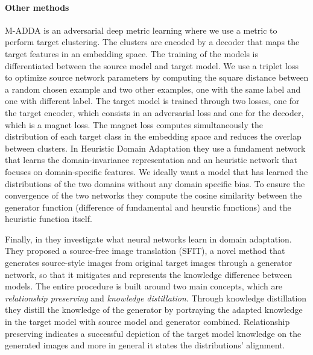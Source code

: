 \paragraph{Other methods}
M-ADDA\cite[Issam H. et al.]{madda} is an adversarial deep metric learning where we use a metric to perform target clustering. The clusters are encoded by a decoder that maps the target features in an embedding space.\newline 
The training of the models is differentiated between the source model and target model. We use a triplet loss to optimize source network parameters by computing the square distance between a random chosen example and two other examples, one with the same label and one with different label. The target model is trained through two losses, one for the target encoder, which consists in an adversarial loss and one for the decoder, which is a magnet loss. The magnet loss computes simultaneously the distribution of each target class in the embedding space and reduces the overlap between clusters. \newline 
In Heuristic Domain Adaptation\cite[Shuhao Cui et al.]{HDA} they use a fundament network that learns the domain-invariance representation and an heuristic network that focuses on domain-specific features. 
We ideally want a model that has learned the distributions of the two domains without any domain specific bias. To ensure the convergence of the two networks they compute the cosine similarity between the generator function (difference of fundamental and heurstic functions) and the heuristic function itself.

Finally, in  \cite[Yunzhong H. et al.]{VAK} they investigate what neural networks learn in domain adaptation. They proposed a source-free image translation (SFIT), a novel method that generates source-style images from original target images through a generator network, so that it mitigates and represents the knowledge difference between models. The entire procedure is built around two main concepts, which are \emph{relationship preserving} and \emph{knowledge distillation}. Through knowledge distillation they distill the knowledge of the generator by portraying the adapted knowledge in the target model with source model and generator combined. Relationship preserving indicates a successful depiction of the target model knowledge on the generated images and more in general it states the distributions' alignment.